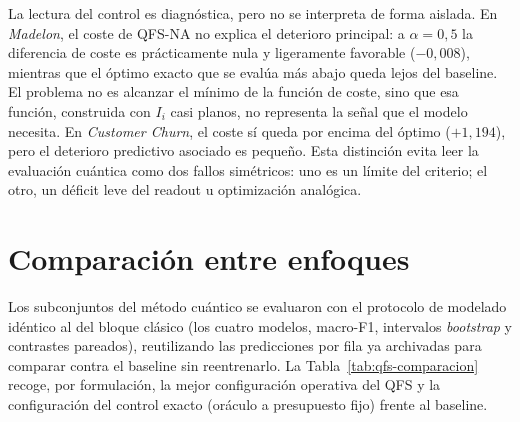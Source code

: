 La lectura del control es diagnóstica, pero no se interpreta de forma
aislada. En \textit{Madelon}, el coste de QFS-NA no explica el deterioro
principal: a $\alpha=0{,}5$ la diferencia de coste es prácticamente nula y
ligeramente favorable ($-0{,}008$), mientras que el óptimo exacto que se evalúa más
abajo queda lejos del baseline. El problema no es alcanzar el mínimo de
la función de coste, sino que esa función, construida con $I_i$ casi
planos, no representa la señal que el modelo necesita. En
\textit{Customer Churn}, el coste sí queda por encima del óptimo
($+1{,}194$), pero el deterioro predictivo asociado es pequeño. Esta
distinción evita leer la evaluación cuántica como dos fallos simétricos:
uno es un límite del criterio; el otro, un déficit leve del readout u
optimización analógica.

\section{Comparación entre enfoques}
\label{sec:res-comparacion}

Los subconjuntos del método cuántico se evaluaron con el protocolo de
modelado idéntico al del bloque clásico (los cuatro modelos, macro-F1,
intervalos \textit{bootstrap} y contrastes pareados), reutilizando las predicciones
por fila ya archivadas para comparar contra el baseline sin reentrenarlo.
La Tabla~\ref{tab:qfs-comparacion} recoge, por formulación, la mejor
configuración operativa del QFS y la configuración del control exacto
(oráculo a presupuesto fijo) frente al baseline.

\begin{table}[!htbp]
  \centering
  \caption[Comparación QFS--baseline en test]{Comparación QFS--baseline en prueba (macro-F1). QFS-NA es la
    ejecución operativa del simulador analógico; QFS-oráculo es el control
    exacto de $Q(x;\alpha)$ a presupuesto fijo. El veredicto aplica la
    misma regla de decisión que el bloque clásico.}
  \label{tab:qfs-comparacion}
  \small
\end{table}
\FloatBarrier

